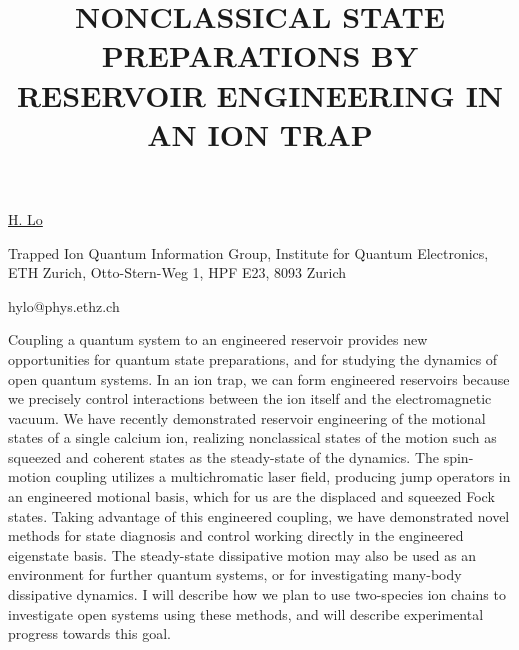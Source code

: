 \title{NONCLASSICAL STATE PREPARATIONS BY RESERVOIR ENGINEERING IN AN ION TRAP}

\underline{H. Lo}

{\normalsize{\vspace{-4mm}
Trapped Ion Quantum Information Group,
Institute for Quantum Electronics,
ETH Zurich,
Otto-Stern-Weg 1, HPF E23,
8093 Zurich

\email hylo@phys.ethz.ch}}

Coupling a quantum system to an engineered reservoir provides new opportunities for quantum state preparations, and for studying
the dynamics of open quantum systems. In an ion trap, we can form engineered reservoirs because we precisely control interactions
between the ion itself and the electromagnetic vacuum. We have recently demonstrated reservoir engineering of the motional states
of a single calcium ion, realizing nonclassical states of the motion such as squeezed and coherent states as the steady-state of the
dynamics. The spin-motion coupling utilizes a multichromatic laser field, producing jump operators in an engineered motional basis,
which for us are the displaced and squeezed Fock states. Taking advantage of this engineered coupling, we have demonstrated novel
methods for state diagnosis and control working directly in the engineered eigenstate basis. The steady-state dissipative motion may
also be used as an environment for further quantum systems, or for investigating many-body dissipative dynamics. I will describe
how we plan to use two-species ion chains to investigate open systems using these methods, and will describe experimental
progress towards this goal.

\vspace{\baselineskip}
